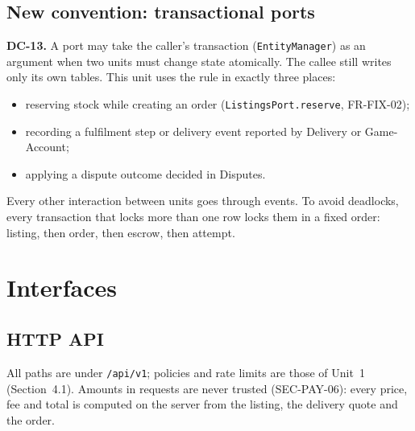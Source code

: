 \documentclass[11pt,a4paper]{article}
\begin{document}
\subsection{New convention: transactional ports}
\label{sec:dc13}
\textbf{DC-13.} A port may take the caller's transaction (\texttt{EntityManager}) as an argument when two units must change state atomically. The callee still writes only its own tables. This unit uses the rule in exactly three places:
\begin{itemize}[nosep]
  \item reserving stock while creating an order (\texttt{ListingsPort.reserve}, FR-FIX-02);
  \item recording a fulfilment step or delivery event reported by Delivery or Game-Account;
  \item applying a dispute outcome decided in Disputes.
\end{itemize}
Every other interaction between units goes through events. To avoid deadlocks, every transaction that locks more than one row locks them in a fixed order: listing, then order, then escrow, then attempt.
\section{Interfaces}

\subsection{HTTP API}
\label{sec:api}
All paths are under \texttt{/api/v1}; policies and rate limits are those of Unit~1 (Section~4.1). Amounts in requests are never trusted (SEC-PAY-06): every price, fee and total is computed on the server from the listing, the delivery quote and the order.
\end{document}
